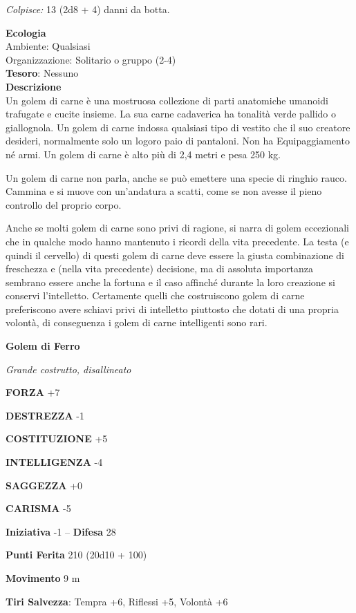 \begin{multicols}{2}
	\textit{Colpisce:} 13 (2d8 + 4) danni da botta.

	\textbf{Ecologia}\\
	Ambiente: Qualsiasi\\
	Organizzazione: Solitario o gruppo (2-4)\\
	\textbf{Tesoro}: Nessuno\\
	\textbf{Descrizione}\\
	Un golem di carne è una mostruosa collezione di parti anatomiche umanoidi trafugate e cucite insieme. La sua carne cadaverica ha tonalità verde pallido o giallognola. Un golem di carne indossa qualsiasi tipo di vestito che il suo creatore desideri, normalmente solo un logoro paio di pantaloni. Non ha Equipaggiamento né armi. Un golem di carne è alto più di 2,4 metri e pesa 250 kg.

	Un golem di carne non parla, anche se può emettere una specie di ringhio rauco. Cammina e si muove con un'andatura a scatti, come se non avesse il pieno controllo del proprio corpo.

	Anche se molti golem di carne sono privi di ragione, si narra di golem eccezionali che in qualche modo hanno mantenuto i ricordi della vita precedente. La testa (e quindi il cervello) di questi golem di carne deve essere la giusta combinazione di freschezza e (nella vita precedente) decisione, ma di assoluta importanza sembrano essere anche la fortuna e il caso affinché durante la loro creazione si conservi l'intelletto. Certamente quelli che costruiscono golem di carne preferiscono avere schiavi privi di intelletto piuttosto che dotati di una propria volontà, di conseguenza i golem di carne intelligenti sono rari.


	\medskip{}\textbf{Golem di Ferro}

	\textit{Grande costrutto, disallineato}

	\textbf{FORZA} +7

	\textbf{DESTREZZA} -1

	\textbf{COSTITUZIONE} +5

	\textbf{INTELLIGENZA} -4

	\textbf{SAGGEZZA} +0

	\textbf{CARISMA} -5

	\textbf{Iniziativa} -1 -- \textbf{Difesa} 28

	\textbf{Punti Ferita} 210 (20d10 + 100)

	\textbf{Movimento} 9 m

	\textbf{Tiri Salvezza}: Tempra +6, Riflessi +5, Volontà +6


\end{multicols}
